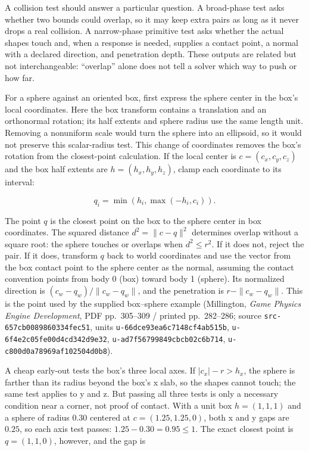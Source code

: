 \hypertarget{06-engine-ii-ch033-from-a-conservative-box-check-to-a-spherebox-contact}{}

A collision test should answer a particular question. A broad-phase test asks whether two bounds could overlap, so it may keep extra pairs as long as it never drops a real collision. A narrow-phase primitive test asks whether the actual shapes touch and, when a response is needed, supplies a contact point, a normal with a declared direction, and penetration depth. These outputs are related but not interchangeable: ``overlap'' alone does not tell a solver which way to push or how far.

For a sphere against an oriented box, first express the sphere center in the box's local coordinates. Here the box transform contains a translation and an orthonormal rotation; its half extents and sphere radius use the same length unit. Removing a nonuniform scale would turn the sphere into an ellipsoid, so it would not preserve this scalar-radius test. This change of coordinates removes the box's rotation from the closest-point calculation. If the local center is \(c=(c_x,c_y,c_z)\) and the box half extents are \(h=(h_x,h_y,h_z)\), clamp each coordinate to its interval:

\[
q_i=\min(h_i,\max(-h_i,c_i)).
\]

The point \(q\) is the closest point on the box to the sphere center in box coordinates. The squared distance \(d^2=\|c-q\|^2\) determines overlap without a square root: the sphere touches or overlaps when \(d^2\le r^2\). If it does not, reject the pair. If it does, transform \(q\) back to world coordinates and use the vector from the box contact point to the sphere center as the normal, assuming the contact convention points from body 0 (box) toward body 1 (sphere). Its normalized direction is \((c_w-q_w)/\|c_w-q_w\|\), and the penetration is \(r-\|c_w-q_w\|\). This is the point used by the supplied box--sphere example (Millington, \emph{Game Physics Engine Development}, PDF pp.~305--309 / printed pp.~282--286; source \texttt{src-657cb0089860334fec51}, units \texttt{u-66dce93ea6c7148cf4ab515b}, \texttt{u-6f4e2c05fe00d4cd342d9e32}, \texttt{u-ad7f56799849cbcb02c6b714}, \texttt{u-c800d0a78969af102504d0b8}).

A cheap early-out tests the box's three local axes. If \(|c_x|-r>h_x\), the sphere is farther than its radius beyond the box's x slab, so the shapes cannot touch; the same test applies to y and z. But passing all three tests is only a necessary condition near a corner, not proof of contact. With a unit box \(h=(1,1,1)\) and a sphere of radius \(0.30\) centered at \(c=(1.25,1.25,0)\), both x and y gaps are \(0.25\), so each axis test passes: \(1.25-0.30=0.95\le1\). The exact closest point is \(q=(1,1,0)\), however, and the gap is

